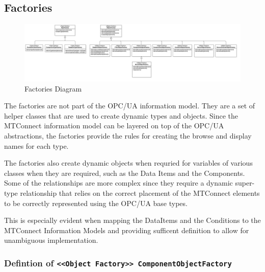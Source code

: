 \FloatBarrier
\subsection{Factories}

\begin{figure}[ht]
  \centering
    \includegraphics[width=1.0\textwidth]{./diagrams/Factories.png}
  \caption{Factories Diagram}
  \label{fig:Factories}
\end{figure}

\FloatBarrier


The factories are not part of the OPC/UA information model. They are a set of helper 
classes that are used to create dynamic types and objects. Since the MTConnect 
information model can be layered on top of the OPC/UA abstractions, the factories
provide the rules for creating the browse and display names for each type.

The factories also create dynamic objects when requried for variables of various
classes when they are required, such as the Data Items and the Components. Some of the
relationships are more complex since they require a dynamic super-type relationship that
relies on the correct placement of the MTConnect elements to be correctly 
represented using the OPC/UA base types.

This is especially evident when mapping the DataItems and the Conditions to the 
MTConnect Information Models and providing sufficent definition to allow for 
unambiguous implementation.

\subsubsection{Defintion of \texttt{<<Object Factory>> ComponentObjectFactory}} \label{type:ComponentObjectFactory}

\FloatBarrier



